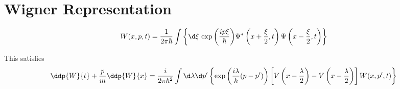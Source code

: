 \section{Wigner Representation}
\label{sec:Wigner_representation}

\begin{equation}
    W(x, p, t) = \dfrac{1}{2\pi\hbar} \int \left\{\d\xi\,\exp{\left(\dfrac{i p\xi}{\hbar}\right)} \Psi^*\left(x + \dfrac{\xi}{2}, t\right) \Psi\left(x - \dfrac{\xi}{2}, t\right)\right\}
\end{equation}

This satisfies
\begin{equation}
    \ddp{W}{t} + \dfrac{p}{m}\ddp{W}{x} = \dfrac{i}{2\pi\hbar^2} \int\d\lambda\d p^\prime \left\{\exp{\left(\dfrac{i \lambda}{\hbar}(p-p^\prime)\right)}\left[V\left(x-\dfrac{\lambda}{2}\right) - V\left(x-\dfrac{\lambda}{2}\right)\right]W(x, p^\prime, t)\right\}
\end{equation}